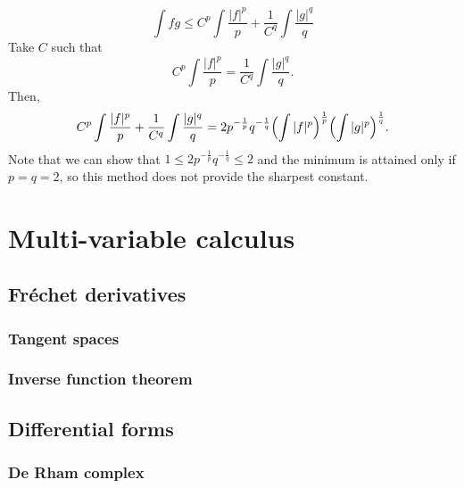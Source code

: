\documentclass{../../large}
\begin{document}
\begin{pf}
\[\int fg\le C^p\int\frac{|f|^p}p+\frac1{C^q}\int\frac{|g|^q}q\]
Take $C$ such that
\[C^p\int\frac{|f|^p}p=\frac1{C^q}\int\frac{|g|^q}q.\]
Then,
\[C^p\int\frac{|f|^p}p+\frac1{C^q}\int\frac{|g|^q}q=2p^{-\frac1p}q^{-\frac1q}\Bigl(\int|f|^p\Bigr)^{\frac1p}\Bigl(\int|g|^p\Bigr)^{\frac1q}.\]
Note that we can show that $1\le2p^{-\frac1p}q^{-\frac1q}\le2$ and the minimum is attained only if $p=q=2$, so this method does not provide the sharpest constant.
\end{pf}









\part{Multi-variable calculus}
\chapter{Fr\'echet derivatives}
\section{Tangent spaces}
\begin{prb}

\end{prb}

\section{Inverse function theorem}


\section{}




\chapter{Differential forms}

\section{De Rham complex}

\begin{prb}
\end{prb}
\end{document}
